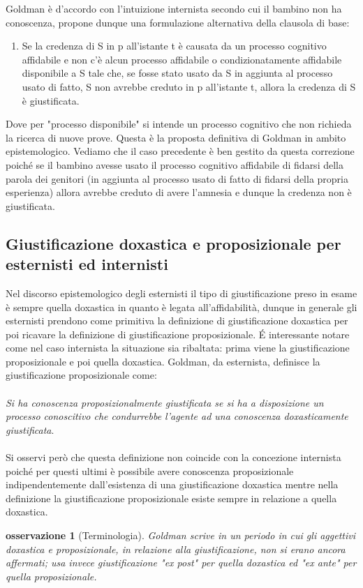 \documentclass[10pt,a4paper]{article}
\newtheorem{osservazione}{osservazione}
\begin{document}
Goldman è d'accordo con l'intuizione internista secondo cui il bambino non ha conoscenza, propone dunque una formulazione alternativa della clausola di base:
\begin{enumerate}
	\item Se la credenza di S in p all'istante t è causata da un processo cognitivo
	affidabile e non c’è alcun processo affidabile o condizionatamente
	affidabile disponibile a S tale che, se fosse stato usato da S in aggiunta al
	processo usato di fatto, S non avrebbe creduto in p all'istante t, allora la credenza di
	S è giustificata.
\end{enumerate}
Dove per "processo disponibile" si intende un processo cognitivo che non richieda la ricerca di nuove prove. Questa è la proposta definitiva di Goldman in ambito epistemologico. Vediamo che il caso precedente è ben gestito da questa correzione poiché se il bambino avesse usato il processo cognitivo affidabile di fidarsi della parola dei genitori (in aggiunta al processo usato di fatto di fidarsi della propria esperienza) allora avrebbe creduto di avere l'amnesia e dunque la credenza non è giustificata.
\subsection{Giustificazione doxastica e proposizionale per esternisti ed internisti}
Nel discorso epistemologico degli esternisti il tipo di giustificazione preso in esame è sempre quella doxastica in quanto è legata all'affidabilità, dunque in generale gli esternisti prendono come primitiva la definizione di giustificazione doxastica per poi ricavare la definizione di giustificazione proposizionale. \'E interessante notare come nel caso internista la situazione sia ribaltata: prima viene la giustificazione proposizionale e poi quella doxastica. Goldman, da esternista, definisce la giustificazione proposizionale come:\\\\
\textit{Si ha conoscenza proposizionalmente giustificata se si ha a disposizione un processo conoscitivo che condurrebbe l'agente ad una conoscenza doxasticamente giustificata}.\\\\ 
Si osservi però che questa definizione non coincide con la concezione internista poiché per questi ultimi è possibile avere conoscenza proposizionale indipendentemente dall'esistenza di una giustificazione doxastica mentre nella definizione la giustificazione proposizionale esiste sempre in relazione a quella doxastica.
\begin{osservazione}[Terminologia]
	Goldman scrive in un periodo in cui gli aggettivi doxastica e proposizionale, in relazione alla giustificazione, non si erano ancora affermati; usa invece giustificazione "ex post" per quella doxastica ed "ex ante" per quella proposizionale.
\end{osservazione}
\newpage 
\end{document}
